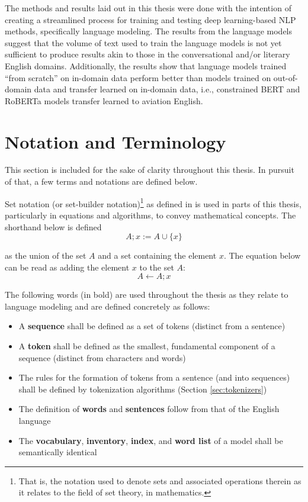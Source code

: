 \documentclass[12pt]{article}
\begin{document}
The methods and results laid out in this thesis were done with the intention of creating a streamlined process for training and testing deep learning-based NLP methods, specifically language modeling. The results from the language models suggest that the volume of text used to train the language models is not yet sufficient to produce results akin to those in the conversational and/or literary English domains. Additionally, the results show that language models trained ``from scratch'' on in-domain data perform better than models trained on out-of-domain data and transfer learned on in-domain data, i.e., constrained BERT and RoBERTa models transfer learned to aviation English.

\section{Notation and Terminology}
This section is included for the sake of clarity throughout this thesis. In pursuit of that, a few terms and notations are defined below.

Set notation (or set-builder notation)\footnote{That is, the notation used to denote sets and associated operations therein as it relates to the field of set theory, in mathematics.} as defined in \cite{jech_chapter_1978} is used in parts of this thesis, particularly in equations and algorithms, to convey mathematical concepts. The shorthand below is defined
\begin{equation*}
    A; x := A \cup \{x\}
\end{equation*}

\noindent
as the union of the set $A$ and a set containing the element $x$. The equation below can be read as adding the element $x$ to the set $A$:
\begin{equation*}
    A \leftarrow A; x
\end{equation*}

The following words (in bold) are used throughout the thesis as they relate to language modeling and are defined concretely as follows:
\begin{itemize}
    \item A \textbf{sequence} shall be defined as a set of tokens (distinct from a sentence)
    \item A \textbf{token} shall be defined as the smallest, fundamental component of a sequence (distinct from characters and words)
    \item The rules for the formation of tokens from a sentence (and into sequences) shall be defined by tokenization algorithms (Section
          \ref{sec:tokenizers})
    \item The definition of \textbf{words} and \textbf{sentences} follow from that of the English language
    \item The \textbf{vocabulary}, \textbf{inventory}, \textbf{index}, and \textbf{word list} of a model shall be semantically identical
\end{itemize}
\end{document}
